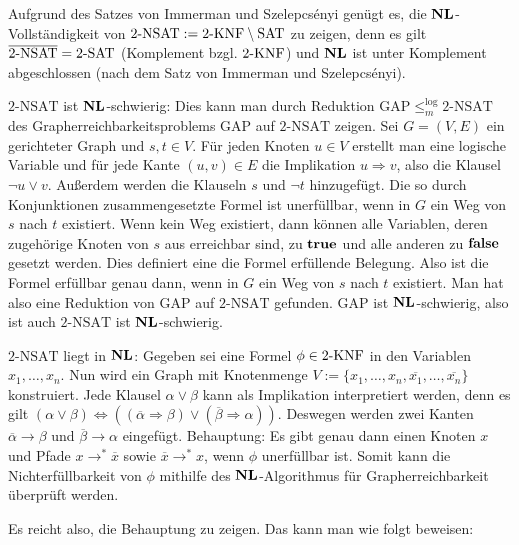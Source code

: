 \begin{Beweis}
    Aufgrund des Satzes von Immerman und Szelepcsényi genügt es,
    die $\mathbf{NL}$-Vollständig\-keit von
    $2\text{-NSAT} := 2\text{-KNF} \setminus \text{SAT}$ zu zeigen,
    denn es gilt $\overline{2\text{-NSAT}} = 2\text{-SAT}$
    (Komplement bzgl. $2\text{-KNF}$) und $\mathbf{NL}$ ist unter Komplement abgeschlossen
    (nach dem Satz von Immerman und Szelepcsényi).
    
    $2\text{-NSAT}$ ist $\mathbf{NL}$-schwierig:
    Dies kann man durch Reduktion $\text{GAP} \le_m^{\log} 2\text{-NSAT}$ des
    Grapherreichbarkeitsproblems GAP auf $2\text{-NSAT}$ zeigen.
    Sei $G = (V, E)$ ein gerichteter Graph und $s, t \in V$.
    Für jeden Knoten $u \in V$ erstellt man eine logische Variable und
    für jede Kante $(u, v) \in E$ die Implikation $u \Rightarrow v$,
    also die Klausel $\lnot u \lor v$.
    Außerdem werden die Klauseln $s$ und $\lnot t$ hinzugefügt.
    Die so durch Konjunktionen zusammengesetzte Formel ist unerfüllbar,
    wenn in $G$ ein Weg von $s$ nach $t$ existiert.
    Wenn kein Weg existiert, dann können alle Variablen, deren zugehörige Knoten von $s$ aus
    erreichbar sind, zu $\mathbf{true}$ und alle anderen zu $\mathbf{false}$ gesetzt werden.
    Dies definiert eine die Formel erfüllende Belegung.
    Also ist die Formel erfüllbar genau dann, wenn in $G$ ein Weg von $s$ nach $t$ existiert.
    Man hat also eine Reduktion von GAP auf $2\text{-NSAT}$ gefunden.
    GAP ist $\mathbf{NL}$-schwierig, also ist auch $2\text{-NSAT}$ ist $\mathbf{NL}$-schwierig.
    
    $2\text{-NSAT}$ liegt in $\mathbf{NL}$:
    Gegeben sei eine Formel $\phi \in 2\text{-KNF}$
    in den Variablen $x_1, \dotsc, x_n$.
    Nun wird ein Graph mit Knotenmenge $V := \{x_1, \dotsc, x_n,
    \overline{x_1}, \dotsc, \overline{x_n}\}$ konstruiert.
    Jede Klausel $\alpha \lor \beta$ kann als Implikation interpretiert werden,
    denn es gilt $(\alpha \lor \beta) \iff ((\overline{\alpha} \Rightarrow \beta) \lor
    (\overline{\beta} \Rightarrow \alpha))$.
    Deswegen werden zwei Kanten $\overline{\alpha} \rightarrow \beta$ und
    $\overline{\beta} \rightarrow \alpha$ eingefügt.
    Behauptung: Es gibt genau dann einen Knoten $x$ und
    Pfade $x \rightarrow^\ast \overline{x}$ sowie $\overline{x} \rightarrow^\ast x$,
    wenn $\phi$ unerfüllbar ist.
    Somit kann die Nichterfüllbarkeit von $\phi$ mithilfe des $\mathbf{NL}$-Algorithmus
    für Grapherreichbarkeit überprüft werden.
    
    Es reicht also, die Behauptung zu zeigen.
    Das kann man wie folgt beweisen:
    

\end{Beweis}
